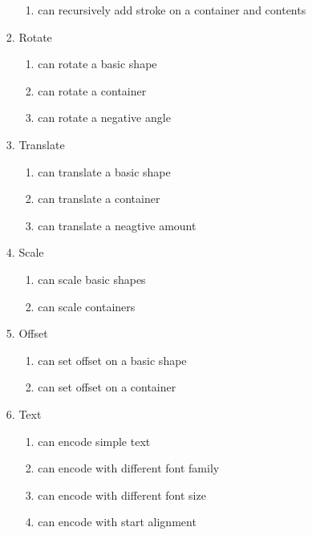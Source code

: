 \begin{enumerate}[label={T\arabic*}]
\begin{enumerate}[label={T\arabic{enumi}.\arabic*}]
\begin{enumerate}[label={T\arabic{enumi}.\arabic{enumii}.\arabic*}]
\begin{enumerate}[label={T\arabic{enumi}.\arabic{enumii}.\arabic{enumiii}.\arabic*}]
            	\item can recursively add stroke on a container and contents
            \end{enumerate}
	        \item Rotate
	        \begin{enumerate}[label={T\arabic{enumi}.\arabic{enumii}.\arabic{enumiii}.\arabic*}]
            	\item can rotate a basic shape
            	\item can rotate a container
            	\item can rotate a negative angle
            \end{enumerate}
	        \item Translate
	        \begin{enumerate}[label={T\arabic{enumi}.\arabic{enumii}.\arabic{enumiii}.\arabic*}]
            	\item can translate a basic shape
            	\item can translate a container
            	\item can translate a neagtive amount
            \end{enumerate}
	        \item Scale
	        \begin{enumerate}[label={T\arabic{enumi}.\arabic{enumii}.\arabic{enumiii}.\arabic*}]
            	\item can scale basic shapes
            	\item can scale containers
            \end{enumerate}
	        \item Offset
	        \begin{enumerate}[label={T\arabic{enumi}.\arabic{enumii}.\arabic{enumiii}.\arabic*}]
            	\item can set offset on a basic shape
            	\item can set offset on a container
            \end{enumerate}
	        \item Text
	        \begin{enumerate}[label={T\arabic{enumi}.\arabic{enumii}.\arabic{enumiii}.\arabic*}]
            	\item can encode simple text
            	\item can encode with different font family
            	\item can encode with different font size
            	\item can encode with start alignment

\end{enumerate}
\end{enumerate}
\end{enumerate}
\end{enumerate}
